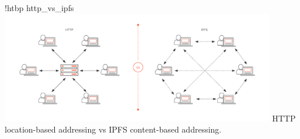 \namedfigure
{!htbp}
{http_vs_ipfs}
{\includegraphics[width=0.9\textwidth]{resources/images/http-vs-ipfs.png}}
{HTTP location-based addressing vs IPFS content-based addressing.}
